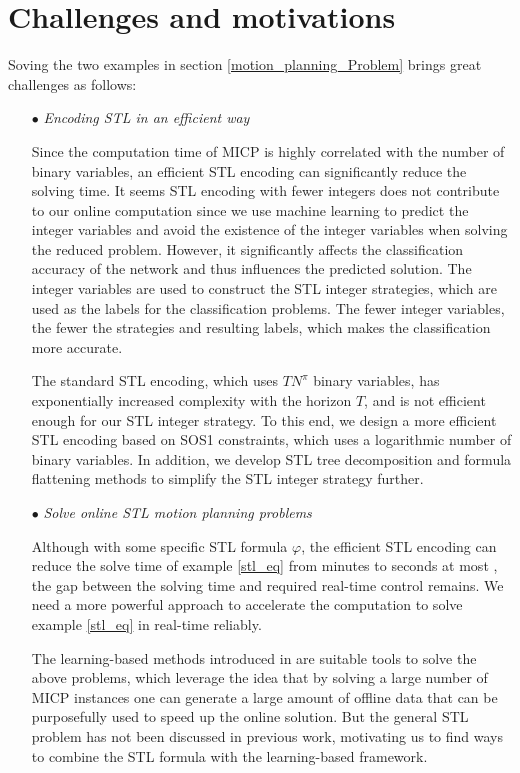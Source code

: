 \documentclass[a4paper]{report}
\begin{document}
\section{Challenges and motivations} 

Soving the two examples in section \ref{motion_planning_Problem} brings great challenges as follows: 

\begin{itemize}
   \item[$\bullet$] \textit{Encoding STL in an efficient way} 
   \item[] 
   Since the computation time of MICP is highly correlated with the number of binary variables, an efficient STL encoding can significantly reduce the solving time. It seems STL encoding with fewer integers does not contribute to our online computation since we use machine learning to predict the integer variables and avoid the existence of the integer variables when solving the reduced problem. However, it significantly affects the classification accuracy of the network and thus influences the predicted solution. The integer variables are used to construct the STL integer strategies, which are used as the labels for the classification problems. The fewer integer variables, the fewer the strategies and resulting labels, which makes the classification more accurate.

   The standard STL encoding, which uses $TN^\pi$ binary variables, has exponentially increased complexity with the horizon $T$, and is not efficient enough for our STL integer strategy. To this end, we design a more efficient STL encoding based on SOS1 constraints, which uses a logarithmic number of binary variables. In addition, we develop STL tree decomposition and formula flattening methods to simplify the STL integer strategy further.

 
  \item[$\bullet$] \textit{Solve online STL motion planning problems}
  \item[]  
  Although with some specific STL formula $\varphi$, the efficient STL encoding can reduce the solve time of example \ref*{stl_eq} from minutes to seconds at most \cite[]{kurtz2022mixed}, the gap between the solving time and required real-time control remains. We need a more powerful approach to accelerate the computation to solve example \ref*{stl_eq} in real-time reliably. 
   
  The learning-based methods introduced in \cite[]{bertsimas2022online}\cite[]{Cauligi2020}\cite[]{bertsimas2021voice}  are suitable tools to solve the above problems, which leverage the idea that by solving a large number of MICP instances one can generate a large amount of offline data that can be purposefully used to speed up the online solution. But the general STL problem has not been discussed in previous work, motivating us to find ways to combine the STL formula with the learning-based framework.

\end{itemize}
\end{document}

